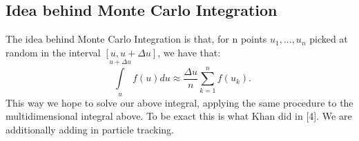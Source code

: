 \subsection{Idea behind Monte Carlo Integration}
The idea behind Monte Carlo Integration is that, for n points $u_1, ..., u_n$ picked at random in the interval $\left[u, u + \Delta u\right]$, we have that:
\begin{equation} \int\limits_u^{u + \Delta u} f(u) du \approx \frac{\Delta u}{n} \sum\limits_{k=1}^n f(u_k). \end{equation}
This way we hope to solve our above integral, applying the same procedure to the multidimensional integral above. To be exact this is what Khan did in [4]. We are additionally adding in particle tracking.
